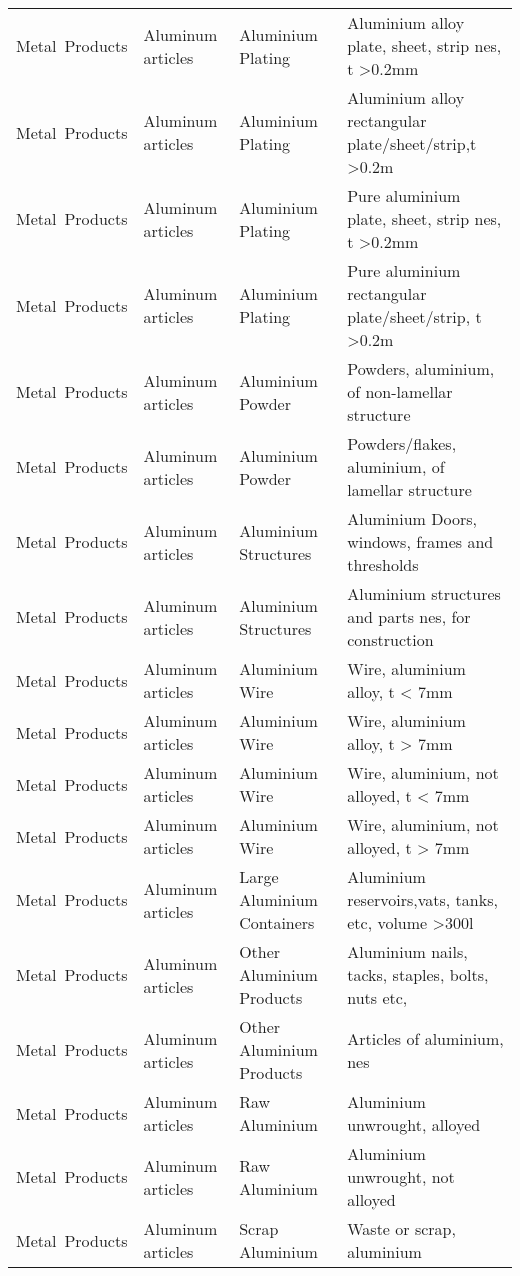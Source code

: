 \begin{appendices}
\begin{xltabular}{\textwidth}{|p{0.10\textwidth}|p{0.25\textwidth}|p{0.20\textwidth}|p{0.35\textwidth}|}
		Metal\ Products & Aluminum articles & Aluminium Plating & Aluminium alloy plate, sheet, strip nes, t >0.2mm \\
		Metal\ Products & Aluminum articles & Aluminium Plating & Aluminium alloy rectangular plate/sheet/strip,t >0.2m \\
		Metal\ Products & Aluminum articles & Aluminium Plating & Pure aluminium plate, sheet, strip nes, t >0.2mm \\
		Metal\ Products & Aluminum articles & Aluminium Plating & Pure aluminium rectangular plate/sheet/strip, t >0.2m \\
		Metal\ Products & Aluminum articles & Aluminium Powder & Powders, aluminium, of non-lamellar structure \\
		Metal\ Products & Aluminum articles & Aluminium Powder & Powders/flakes, aluminium, of lamellar structure \\
		Metal\ Products & Aluminum articles & Aluminium Structures & Aluminium Doors, windows, frames and thresholds \\
		Metal\ Products & Aluminum articles & Aluminium Structures & Aluminium structures and parts nes, for construction \\
		Metal\ Products & Aluminum articles & Aluminium Wire & Wire, aluminium alloy, t < 7mm \\
		Metal\ Products & Aluminum articles & Aluminium Wire & Wire, aluminium alloy, t > 7mm \\
		Metal\ Products & Aluminum articles & Aluminium Wire & Wire, aluminium, not alloyed, t < 7mm \\
		Metal\ Products & Aluminum articles & Aluminium Wire & Wire, aluminium, not alloyed, t > 7mm \\
		Metal\ Products & Aluminum articles & Large Aluminium Containers & Aluminium reservoirs,vats, tanks, etc, volume >300l \\
		Metal\ Products & Aluminum articles & Other Aluminium Products & Aluminium nails, tacks, staples, bolts, nuts etc, \\
		Metal\ Products & Aluminum articles & Other Aluminium Products & Articles of aluminium, nes \\
		Metal\ Products & Aluminum articles & Raw Aluminium & Aluminium unwrought, alloyed \\
		Metal\ Products & Aluminum articles & Raw Aluminium & Aluminium unwrought, not alloyed \\
		Metal\ Products & Aluminum articles & Scrap Aluminium & Waste or scrap, aluminium \\

\end{xltabular}
\end{appendices}
